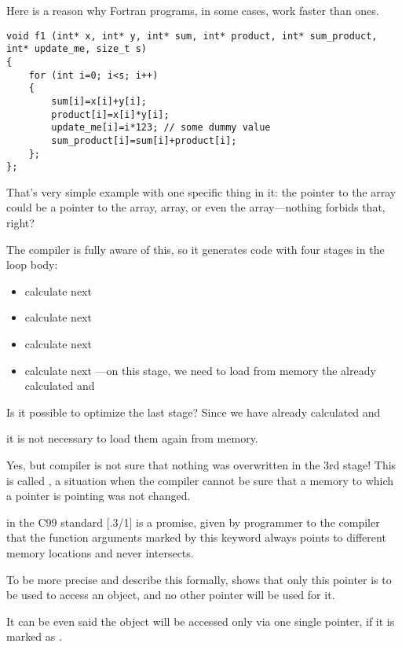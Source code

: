 
Here is a reason why Fortran programs, in some cases, work faster than \CCpp ones.

\begin{lstlisting}
void f1 (int* x, int* y, int* sum, int* product, int* sum_product, int* update_me, size_t s)
{
	for (int i=0; i<s; i++)
	{
		sum[i]=x[i]+y[i];
		product[i]=x[i]*y[i];
		update_me[i]=i*123; // some dummy value
		sum_product[i]=sum[i]+product[i];	
	};
};
\end{lstlisting}

That's very simple example with one specific
thing in it: 
the pointer to the  array could be
a pointer to the
 array,  array, or even the 
 array---nothing forbids that, right?

The compiler is fully aware of this, so it generates code with four stages in the loop body:
\begin{itemize}
\item calculate next 
\item calculate next 
\item calculate next 
\item calculate next ---on this stage, we need to load from memory
the already calculated  and 
\end{itemize}

Is it possible to optimize the last stage?
Since we have already calculated  and  

it is not necessary to load them again from memory.

Yes, but compiler is not sure that nothing was overwritten in the 3rd stage!
This is called , 
a situation when the compiler cannot be sure that a memory to which a pointer is pointing was not changed.

 in the C99 standard [.3/1]
is a promise, given by programmer to the compiler that the function arguments 
marked by this keyword always points to different memory locations and never intersects.

To be more precise and describe this formally,  shows that only this pointer is to be used
to access an object, and no other pointer will be used for it.

It can be even said the object will be accessed
only via one single pointer, if it is marked as .

